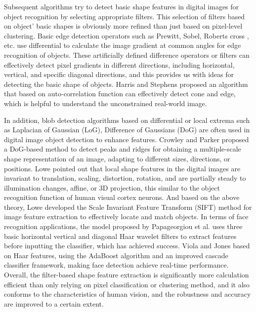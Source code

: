 \documentclass[10pt, a4paper]{article}
\begin{document}
\begin{multicols}{2}
	\par
	Subsequent algorithms try to detect basic shape features in digital images for object recognition by selecting appropriate filters. This selection of filters based on object’ basic shapes is obviously more refined than just based on pixel-level clustering. Basic edge detection operators such as Prewitt, Sobel, Roberts cross \cite{gonzales2002digital}, etc. use differential to calculate the image gradient at common angles for edge recognition of objects. These artificially defined difference operators or filters can effectively detect pixel gradients in different directions, including horizontal, vertical, and specific diagonal directions, and this provides us with ideas for detecting the basic shape of objects. Harris and Stephens \cite{harris1988combined} proposed an algorithm that based on auto-correlation function can effectively detect cone and edge, which is helpful to understand the unconstrained real-world image. 
	\par
	In addition, blob detection algorithms based on differential or local extrema such as Laplacian of Gaussian (LoG), Difference of Gaussians (DoG) are often used in digital image object detection to enhance features. Crowley and Parker \cite{crowley1984representation} proposed a DoG-based method to detect peaks and ridges for obtaining a multiple-scale shape representation of an image, adapting to different sizes, directions, or positions. Lowe \cite{lowe1999object} pointed out that local shape features in the digital images are invariant to translation, scaling, distortion, rotation, and are partially steady to illumination changes, affine, or 3D projection, this similar to the object recognition function of human visual cortex neurons. And based on the above theory, Lowe developed the Scale Invariant Feature Transform (SIFT) method for image feature extraction to effectively locate and match objects. In terms of face recognition applications, the model proposed by Papageorgiou et al. \cite{papageorgiou1998general} uses three basic horizontal vertical and diagonal Haar wavelet filters to extract features before inputting the classifier, which has achieved success. Viola and Jones \cite{viola2005detecting} based on Haar features, using the AdaBoost algorithm and an improved cascade classifier framework, making face detection achieve real-time performance. Overall, the filter-based shape feature extraction is significantly more calculation efficient than only relying on pixel classification or clustering method, and it also conforms to the characteristics of human vision, and the robustness and accuracy are improved to a certain extent.

\end{multicols}
\end{document}
